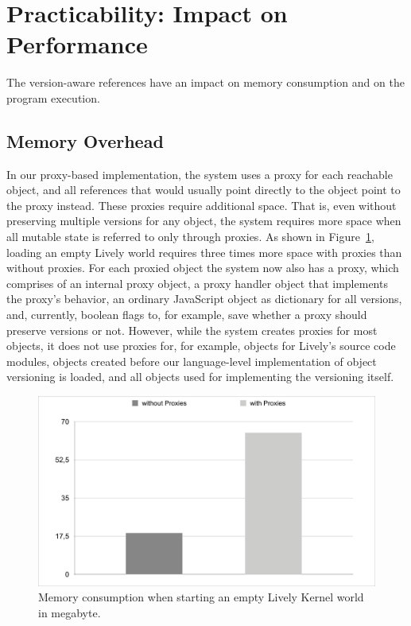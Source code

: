 \section{Practicability: Impact on Performance}

The version-aware references have an impact on memory consumption and on the program execution.

\subsection{Memory Overhead}

In our proxy-based implementation, the system uses a proxy for each reachable object, and all references that would usually point directly to the object point to the proxy instead.
These proxies require additional space.
That is, even without preserving multiple versions for any object, the system requires more space when all mutable state is referred to only through proxies.
As shown in Figure~\ref{fig:MemoryOverhead}, loading an empty Lively world requires three times more space with proxies than without proxies.
For each proxied object the system now also has a proxy, which comprises of an internal proxy object, a proxy handler object that implements the proxy's behavior, an ordinary JavaScript object as dictionary for all versions, and, currently, boolean flags to, for example, save whether a proxy should preserve versions or not.
However, while the system creates proxies for most objects, it does not use proxies for, for example, objects for Lively's source code modules, objects created before our language-level implementation of object versioning is loaded, and all objects used for implementing the versioning itself. 

\begin{figure}[h]
    \centering
    \includegraphics[width=\textwidth]{figures/memoryOverhead.pdf}
    \caption{Memory consumption when starting an empty Lively Kernel world in megabyte.}
    \label{fig:MemoryOverhead}
\end{figure}

